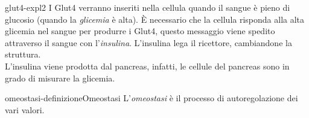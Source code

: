 \documentclass[preview]{standalone}
\begin{document}

\begin{snippet}{glut4-expl2}
    I Glut4 verranno inseriti nella cellula quando il sangue è pieno di glucosio (quando la \textit{glicemia} è alta).
È necessario che la cellula risponda alla alta glicemia nel sangue per produrre i Glut4,
questo messaggio viene spedito attraverso il sangue con l'\textit{insulina}.
L'insulina lega il ricettore, cambiandone la struttura. \\
L'insulina viene prodotta dal pancreas, infatti, le cellule del pancreas sono in grado di misurare la glicemia.
\end{snippet}



\begin{snippetdefinition}{omeostasi-definizione}{Omeostasi}
    L'\textit{omeostasi} è il processo di autoregolazione dei vari valori.
\end{snippetdefinition}




\end{document}
